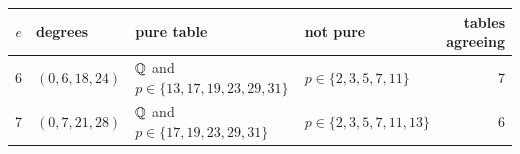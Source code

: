 \begin{tabular}{@{}rl>{\raggedright\arraybackslash}p{3.4cm}>{\raggedright\arraybackslash}p{3.2cm}r@{}}
\toprule
$e$ & degrees & pure table & not pure & tables agreeing\\
\midrule
6 & $(0,6,18,24)$ & $\mathbb{Q}$ and $p\in\{13,17,19,23,29,31\}$ & $p\in\{2,3,5,7,11\}$ & 7\\
7 & $(0,7,21,28)$ & $\mathbb{Q}$ and $p\in\{17,19,23,29,31\}$ & $p\in\{2,3,5,7,11,13\}$ & 6\\
\bottomrule
\end{tabular}
